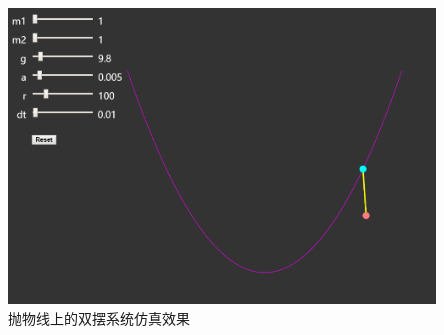 \documentclass[a4paper, 12pt]{article}
\begin{document}
\begin{center}
\includegraphics[width=0.85\textwidth]{images/pendulum.png}\\
抛物线上的双摆系统仿真效果
\end{center}
\end{document}
